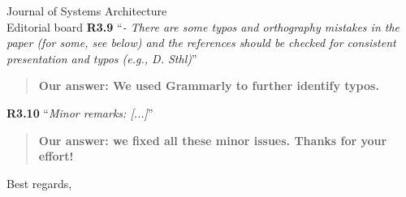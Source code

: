\documentclass[a4paper,10pt]{letter}
\begin{document}
\begin{letter}{Journal of Systems Architecture\\
    Editorial board}
\textbf{R3.9} ``\textit{- There are some typos and orthography mistakes in the paper (for some, see below) and the references should be checked for consistent presentation and typos (e.g., D. Sthl)}''
\begin{quote}
\textbf{Our answer: We used Grammarly to further identify typos.}
\end{quote}

\textbf{R3.10} ``\textit{Minor remarks: [...]}''
\begin{quote}
\textbf{Our answer: we fixed all these minor issues. Thanks for your effort!}
\end{quote}

\hrulefill

\vfill

\closing{Best regards,}




\end{letter}
\end{document}
